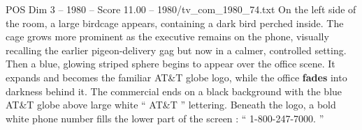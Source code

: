 \begin{textsample}{POS Dim 3 – 1980 – Score 11.00 – 1980/tv\_com\_1980\_74.txt}
On the left side of the room, a large birdcage appears, containing a dark bird perched inside.
The cage grows more prominent as the executive remains on the phone, visually recalling the earlier pigeon-delivery gag but now in a calmer, controlled setting.
Then a blue, glowing striped sphere begins to appear over the office scene.
It expands and becomes the familiar AT\&T globe logo, while the office \textbf{fades} into darkness behind it.
The commercial ends on a black background with the blue AT\&T globe above large white “ AT\&T ” lettering.
Beneath the logo, a bold white phone number fills the lower part of the screen : “ 1-800-247-7000. ”

\end{textsample}
